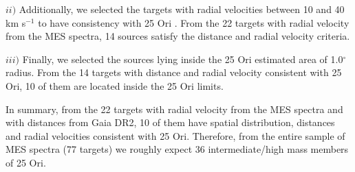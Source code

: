 \documentclass[12pt]{article}
\begin{document}
$ii)$ Additionally, we selected the targets with radial velocities between 10 and 40 km s$^{-1}$ to have consistency with 25 Ori \citep{Briceno2007}. From the 22 targets with radial velocity from the MES spectra, 14 sources satisfy the distance and radial velocity criteria. 

$iii)$ Finally, we selected the sources lying inside the 25 Ori estimated area of 1.0$^\circ$ radius. From the 14 targets with distance and radial velocity consistent with 25 Ori, 10 of them are located inside the 25 Ori limits.

In summary, from the 22 targets with radial velocity from the MES spectra and with distances from Gaia DR2, 10 of them have spatial distribution, distances and radial velocities consistent with 25 Ori. Therefore, from the entire sample of MES spectra (77 targets) we roughly expect 36 intermediate/high mass members of 25 Ori. %
\end{document}
